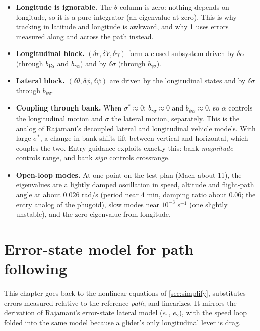 \documentclass[11pt]{report}
\numberwithin{equation}{chapter}
\begin{document}
\begin{itemize}
\item \textbf{Longitude is ignorable.} The $\theta$ column is zero: nothing depends on
  longitude, so it is a pure integrator (an eigenvalue at zero). This is why tracking
  in latitude and longitude is awkward, and why \cref{ch:err} uses errors measured along
  and across the path instead.
\item \textbf{Longitudinal block.} $(\delta r, \delta V, \delta\gamma)$ form a closed
  subsystem driven by $\delta\alpha$ (through $b_{V\alpha}$ and $b_{\gamma\alpha}$) and by
  $\delta\sigma$ (through $b_{\gamma\sigma}$).
\item \textbf{Lateral block.} $(\delta\theta, \delta\phi, \delta\psi)$ are driven by the
  longitudinal states and by $\delta\sigma$ through $b_{\psi\sigma}$.
\item \textbf{Coupling through bank.} When $\sigma^*\approx 0$: $b_{\gamma\sigma}\approx 0$
  and $b_{\psi\alpha}\approx 0$, so $\alpha$ controls the longitudinal motion and $\sigma$ the
  lateral motion, separately. This is the analog of Rajamani's decoupled lateral and
  longitudinal vehicle models. With large $\sigma^*$, a change in bank shifts lift between
  vertical and horizontal, which couples the two. Entry guidance exploits exactly this:
  bank \emph{magnitude} controls range, and bank \emph{sign} controls crossrange.
\item \textbf{Open-loop modes.} At one point on the test plan (Mach about 11), the
  eigenvalues are a lightly damped oscillation in speed, altitude and flight-path angle
  at about $0.026$ rad/s (period near 4 min, damping ratio about 0.06; the entry analog of
  the phugoid), slow modes near $10^{-3}$ s$^{-1}$ (one slightly unstable), and the zero
  eigenvalue from longitude.
\end{itemize}

\chapter{Error-state model for path following}\label{ch:err}

This chapter goes back to the nonlinear equations of \cref{sec:simplify}, substitutes
errors measured relative to the reference \emph{path}, and linearizes. It mirrors the
derivation of Rajamani's error-state lateral model ($e_1$, $e_2$), with the speed loop
folded into the same model because a glider's only longitudinal lever is drag.
\end{document}
